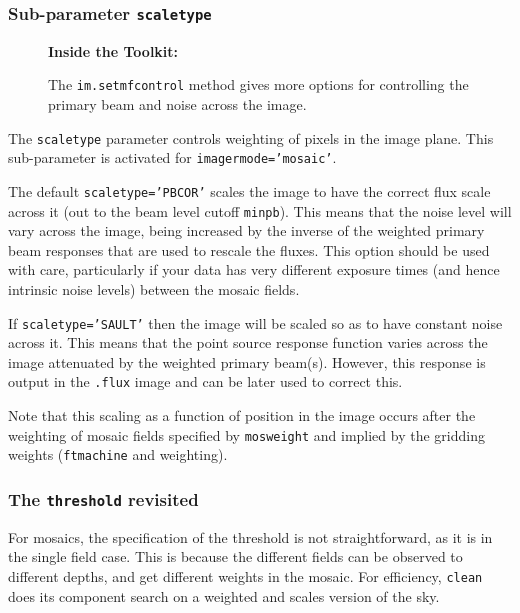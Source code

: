 \subsubsection{Sub-parameter {\tt scaletype} }
\label{section:im.clean.imagermode.scaletype}

\begin{wrapfigure}{r}{2.5in}
  \begin{boxedminipage}{2.5in}
     \centerline{\bf Inside the Toolkit:}
     The {\tt im.setmfcontrol} method gives more options for
     controlling the primary beam and noise across the image.
  \end{boxedminipage}
\end{wrapfigure}

The {\tt scaletype} parameter controls weighting of pixels in the 
image plane.  This sub-parameter is activated for {\tt imagermode='mosaic'}.

The default {\tt scaletype='PBCOR'} scales the
image to have the correct flux scale across it (out to the beam
level cutoff {\tt minpb}).  This means that the noise level will
vary across the image, being increased by the inverse of the 
weighted primary beam responses that are used to rescale the
fluxes.  This option should
be used with care, particularly if your data has very different exposure
times (and hence intrinsic noise levels) between the mosaic fields.

If {\tt scaletype='SAULT'} then the image will be scaled so as to have
constant noise across it.  This means that the point source response
function varies across the image attenuated by the weighted primary
beam(s).  However, this response is output in the {\tt .flux} image
and can be later used to correct this.

Note that this scaling as a function of position in the image occurs
after the weighting of mosaic fields specified by {\tt mosweight}
and implied by the gridding weights ({\tt ftmachine} and {weighting}).

\subsubsection{The {\tt threshold} revisited}
\label{section:im.clean.imagermode.threshold}

For mosaics, the specification of the threshold is not
straightforward, as it is in the single field case.  This is because
the different fields can be observed to different depths, and get
different weights in the mosaic.  For efficiency, {\tt clean} does
its component search on a weighted and scales version of the sky.

